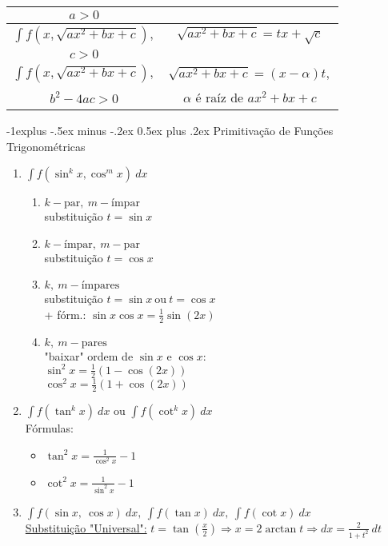 \documentclass[10pt,landscape]{article}
\makeatletter
\renewcommand{\subsection}{\@startsection{subsection}{2}{0mm}%
                                {-1explus -.5ex minus -.2ex}%
                                {0.5ex plus .2ex}%
                                {\normalfont\normalsize\bfseries}}
\makeatother
\begin{document}
\begin{multicols}{3}
\begin{tabular}{|c|c|}
$a > 0$ &\\
\hline
$\int f(x, \sqrt{ax^2+bx+c}),$ & $\sqrt{ax^2+bx+c} = tx+\sqrt{c}$\\

$c > 0$ &\\
\hline
$\int f(x, \sqrt{ax^2+bx+c}),$ & $\sqrt{ax^2+bx+c} = (x-\alpha)t,$\\

$b^2-4ac > 0$ & $\alpha$ é raíz de $ax^2+bx+c$\\
\hline
\end{tabular} 

\subsection{Primitivação de Funções Trigonométricas}

\begin{enumerate}
\item $\int f(\sin^kx, \cos^mx)\ dx$
\begin{enumerate}
\item $k - \text{par},\ m - \text{ímpar}$\\
\hspace{0.2cm} substituição $t=\sin x$
\item $k - \text{ímpar},\ m - \text{par}$\\
\hspace{0.2cm} substituição $t=\cos x$
\item $k,\ m - \text{ímpares}$\\
\hspace{0.2cm} substituição $t=\sin x\ \text{ou}\ t = \cos x$\\
\hspace{0.2cm} + fórm.: $\sin x \cos x = \frac{1}{2} \sin (2x)$
\item $k,\ m - \text{pares}$\\
\hspace{0.2cm} "baixar" ordem de $\sin x$ e $\cos x$:\\
\hspace{0.2cm} $\sin^2x=\frac{1}{2}(1-\cos (2x))$\\
\hspace{0.2cm} $\cos^2x=\frac{1}{2}(1+\cos (2x))$\\
\end{enumerate}
\item $\int f(\tan^kx)\ dx$ ou $\int f(\cot^kx)\ dx$\\
Fórmulas: \begin{itemize}%
\item $\tan^2x = \frac{1}{\cos^2x}-1$
\item $\cot^2x = \frac{1}{\sin^2x}-1$
\end{itemize}
\item $\int f(\sin x,\ \cos x)\ dx,\ \int f(\tan x)\ dx,\ \int f(\cot x)\ dx$\\
\underline{Substituição "Universal":} $t = \tan(\frac{x}{2}) \Rightarrow x = 2\arctan t \Rightarrow dx = \frac{2}{1+t^2}\ dt$
\end{enumerate}


\end{multicols}
\end{document}
